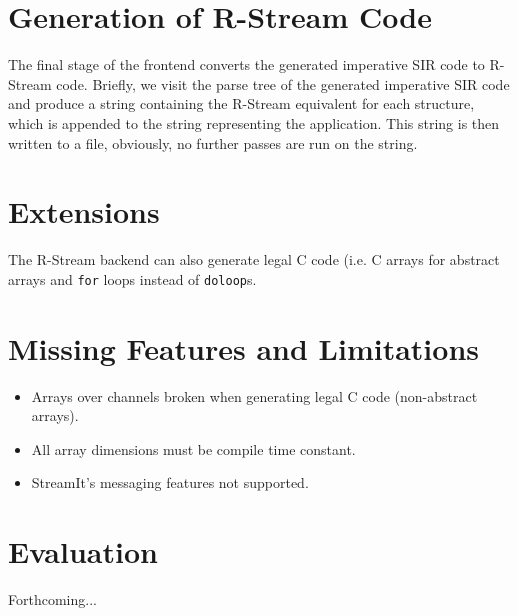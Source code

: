 \documentclass[10pt, letterpaper, onecolumn]{article}
\begin{document}
\section{Generation of R-Stream Code}
\label{rstreamcode}
The final stage of the frontend converts the generated imperative SIR
code to R-Stream code.  Briefly, we visit the parse tree of the generated
imperative SIR code and produce a string containing the R-Stream equivalent
for each structure, which is appended to the string representing the
application.  This string is then written to a file, obviously, no
further passes are run on the string.



\section{Extensions}
The R-Stream backend can also generate legal C code (i.e. C arrays for
abstract arrays and {\tt for} loops instead of {\tt doloop}s.

\section{Missing Features and Limitations}
\begin{itemize}
\item Arrays over channels broken when generating legal C code
  (non-abstract arrays).
\item All array dimensions must be compile time constant.
\item StreamIt's messaging features not supported.
\end{itemize}

\section{Evaluation}
Forthcoming...
\end{document}
